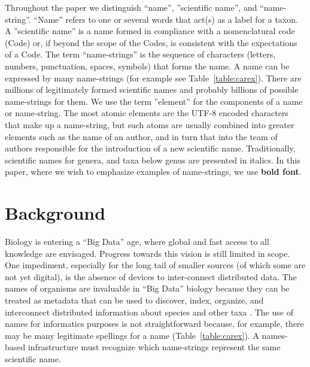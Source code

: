 \documentclass{bmcart}
\begin{document}
Throughout the paper we distinguish ``name'', ''scientific name'', and
``name-string''.  ``Name'' refers to one or several words that act(s) as a label
for a taxon. A ''scientific name'' is a name formed in compliance with a
nomenclatural code (Code) or, if beyond the scope of the Codes, is consistent
with the expectations of a Code.  The term ``name-strings'' is the sequence of
characters (letters, numbers, punctuation, spaces, symbols) that forms the
name.  A name can be expressed by many name-strings (for example see
Table~\ref{table:carex}).  There are millions of
legitimately formed scientific names and probably billions of possible
name-strings for them. We use the term ''element'' for the components of a name or name-string. The most atomic elements are the UTF-8 encoded characters that make up a name-string, but such atoms are usually combined into greater elements such as the name of an author, and in turn that into the team of authors responsible for the introduction of a new scientific name.  Traditionally, scientific names for genera, and taxa
below genus are presented in italics. In this paper, where we wish to emphasize examples of
name-strings, we use \textbf{bold font}.

\section*{Background}

Biology is entering a ``Big Data'' age, where global and fast access to all knowledge are envisaged. Progress towards this vision is still limited in scope. One impediment,
especially for the long tail of smaller sources (of which some are not yet
digital), is the absence of devices to inter-connect distributed data.  The names of
organisms are invaluable in ``Big Data'' biology because they can be treated as metadata that can be used to discover, index, organize, and interconnect distributed information about species and other taxa \cite{Patterson2010}.  The use of names for informatics purposes is not straightforward because, for example, there may be many legitimate spellings for a name (Table~\ref{table:carex}). A names-based infrastructure must recognize which name-strings represent the same scientific name.
\end{document}
